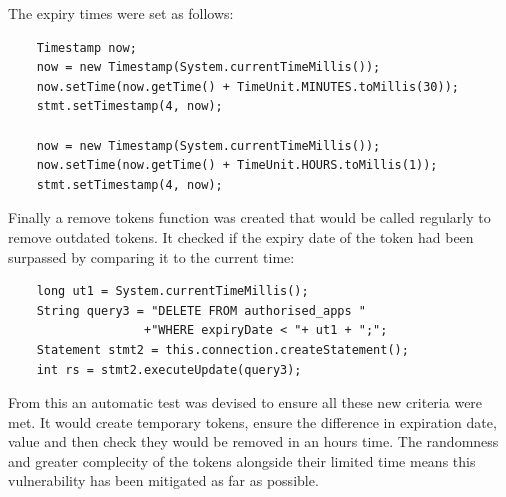 The expiry times were set as follows:
\begin{verbatim}
    Timestamp now;
    now = new Timestamp(System.currentTimeMillis());
    now.setTime(now.getTime() + TimeUnit.MINUTES.toMillis(30));
    stmt.setTimestamp(4, now);

    now = new Timestamp(System.currentTimeMillis());
    now.setTime(now.getTime() + TimeUnit.HOURS.toMillis(1));
    stmt.setTimestamp(4, now);
\end{verbatim}
Finally a remove tokens function was created that would be called regularly to remove outdated tokens. It checked if the expiry date of the token had been surpassed by comparing
it to the current time:
\begin{verbatim}
    long ut1 = System.currentTimeMillis();
    String query3 = "DELETE FROM authorised_apps "
                   +"WHERE expiryDate < "+ ut1 + ";";
    Statement stmt2 = this.connection.createStatement();
    int rs = stmt2.executeUpdate(query3);
\end{verbatim}
From this an automatic test was devised to ensure all these new criteria were met. It would create temporary tokens, ensure the difference in expiration date, value and then check
they would be removed in an hours time. The randomness and greater complecity of the tokens alongside their limited time means this vulnerability has been mitigated as far as 
possible.

